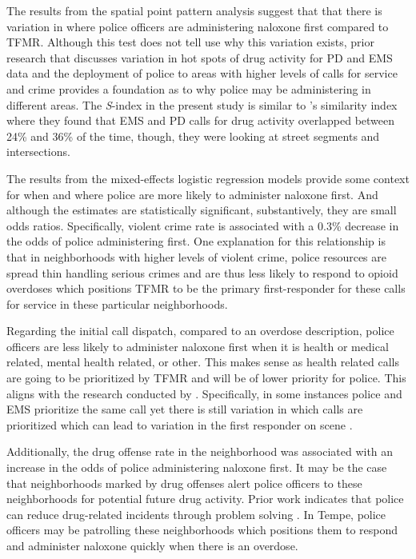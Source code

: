 The results from the spatial point pattern analysis suggest that that there is variation in where police officers are administering naloxone first compared to TFMR. Although this test does not tell use why this variation exists, prior research that discusses variation in hot spots of drug activity for PD and EMS data \parencite{hibdon_concentration_2017, hibdon_going_2021} and the deployment of police to areas with higher levels of calls for service and crime \parencite{engel_police_2003} provides a foundation as to why police may be administering in different areas. The \textit{S}-index in the present study is similar to \textcite{hibdon_concentration_2017}'s similarity index where they found that EMS and PD calls for drug activity overlapped between 24\% and 36\% of the time, though, they were looking at street segments and intersections. 

The results from the mixed-effects logistic regression models provide some context for when and where police are more likely to administer naloxone first. And although the estimates are statistically significant, substantively, they are small odds ratios. Specifically, violent crime rate is associated with a 0.3\% decrease in the odds of police administering first. One explanation for this relationship is that in neighborhoods with higher levels of violent crime, police resources are spread thin handling serious crimes and are thus less likely to respond to opioid overdoses which positions TFMR to be the primary first-responder for these calls for service in these particular neighborhoods.

Regarding the initial call dispatch, compared to an overdose description, police officers are less likely to administer naloxone first when it is health or medical related, mental health related, or other. This makes sense as health related calls are going to be prioritized by TFMR and will be of lower priority for police. This aligns with the research conducted by \textcite{seim_bandage_2020}. Specifically, in some instances police and EMS prioritize the same call yet there is still variation in which calls are prioritized which can lead to variation in the first responder on scene \parencite{hibdon_concentration_2017}.

Additionally, the drug offense rate in the neighborhood was associated with an increase in the odds of police administering naloxone first. It may be the case that neighborhoods marked by drug offenses alert police officers to these neighborhoods for potential future drug activity. Prior work indicates that police can reduce drug-related incidents through problem solving \parencite{mazerolle_street-level_2007}. In Tempe, police officers may be patrolling these neighborhoods which positions them to respond and administer naloxone quickly when there is an overdose. 

